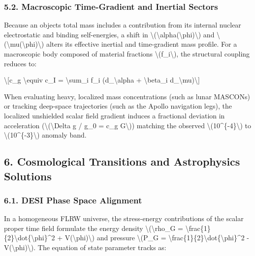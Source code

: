 \documentclass[
  10pt,
]{article}
\begin{document}
\hypertarget{macroscopic-time-gradient-and-inertial-sectors}{%
\subsubsection{5.2. Macroscopic Time-Gradient and Inertial
Sectors}\label{macroscopic-time-gradient-and-inertial-sectors}}

Because an object\textquotesingle s total mass includes a contribution
from its internal nuclear electrostatic and binding self-energies, a
shift in
\textbackslash(\textbackslash alpha(\textbackslash phi)\textbackslash)
and \textbackslash(\textbackslash mu(\textbackslash phi)\textbackslash)
alters its effective inertial and time-gradient mass profile. For a
macroscopic body composed of material fractions
\textbackslash(f\_i\textbackslash), the structural coupling reduces to:

\textbackslash{[}c\_g \textbackslash equiv c\_I = \textbackslash sum\_i
f\_i (d\_\textbackslash alpha + \textbackslash beta\_i
d\_\textbackslash mu)\textbackslash{]}

When evaluating heavy, localized mass concentrations (such as lunar
MASCONs) or tracking deep-space trajectories (such as the Apollo
navigation legs), the localized unshielded scalar field gradient induces
a fractional deviation in acceleration
(\textbackslash(\textbackslash Delta g / g\_0 = c\_g G\textbackslash))
matching the observed \textbackslash(10\^{}\{-4\}\textbackslash) to
\textbackslash(10\^{}\{-3\}\textbackslash) anomaly band.

\hypertarget{cosmological-transitions-and-astrophysics-solutions}{%
\subsection{6. Cosmological Transitions and Astrophysics
Solutions}\label{cosmological-transitions-and-astrophysics-solutions}}

\hypertarget{desi-phase-space-alignment}{%
\subsubsection{6.1. DESI Phase Space
Alignment}\label{desi-phase-space-alignment}}

In a homogeneous FLRW universe, the stress-energy contributions of the
scalar proper time field formulate the energy density
\textbackslash(\textbackslash rho\_G =
\textbackslash frac\{1\}\{2\}\textbackslash dot\{\textbackslash phi\}\^{}2
+ V(\textbackslash phi)\textbackslash) and pressure \textbackslash(P\_G
=
\textbackslash frac\{1\}\{2\}\textbackslash dot\{\textbackslash phi\}\^{}2
- V(\textbackslash phi)\textbackslash). The equation of state parameter
tracks as:
\end{document}
